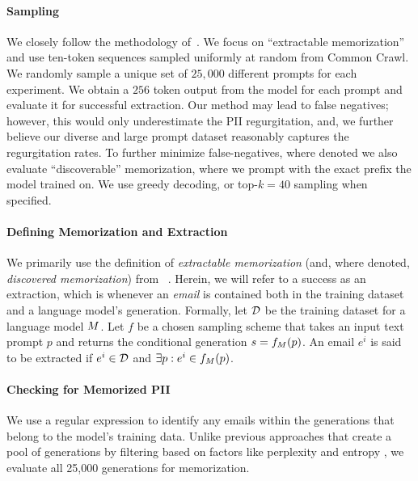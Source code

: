 \paragraph{Sampling}
We closely follow the methodology of~\citet{carlini-extraction,nasr2023scalable}. We focus on ``extractable memorization'' and use ten-token sequences sampled uniformly at random from Common Crawl. We randomly sample a unique set of $25,000$ different prompts for each experiment. We obtain a $256$ token output from the model for each prompt and evaluate it for successful extraction. Our method may lead to false negatives; however, this would only underestimate the PII regurgitation, and, we further believe our diverse and large prompt dataset reasonably captures the regurgitation rates. To further minimize false-negatives, where denoted we also evaluate ``discoverable'' memorization, where we prompt with the exact prefix the model trained on.
We use greedy decoding, or top-$k=40$ sampling when specified.


\paragraph{Defining Memorization and Extraction}
We primarily use the definition of \emph{extractable memorization} (and, where denoted, \emph{discovered memorization}) from 
~\citet{nasr2023scalable}. Herein, we will refer to a success as an extraction, which is whenever an \emph{email} is contained both in the training dataset and a language model's generation.
Formally, let $\mathcal{D}$ be the training dataset for a language model $M$. Let $f$ be a chosen sampling scheme that takes an input text prompt $p$ and returns the conditional generation $s=f_{M}(p)$. An email $e^i$ is said to be extracted if $e^i \in \mathcal{D}$ and $\exists p : e^i \in f_{M}(p)$.

\paragraph{Checking for Memorized PII}
We use a regular expression to identify any emails within the generations that belong to the model's training data. Unlike previous approaches that create a pool of generations by filtering based on factors like perplexity and entropy \citep{carlini-extraction}, we evaluate all 25,000 generations for memorization.




















